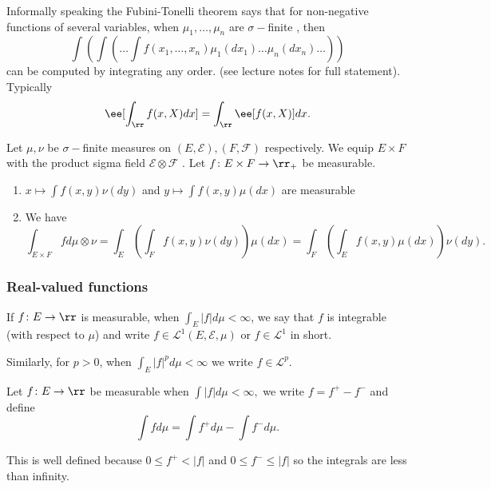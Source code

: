 \documentclass[../main.tex]{subfiles}
\begin{document}
Informally speaking the Fubini-Tonelli theorem says that for
non-negative functions of several variables, when $\mu_1, \ldots,
\mu_{n}$ are $\sigma-$finite , then
\[
  \int\left(\int \left(\ldots \int f(x_1,\ldots, x_n) \mu_1(dx_1) \ldots
  \mu_n(dx_n)\ldots\right)\right)
\]
can be computed by integrating any order. (see lecture notes for full
statement). Typically
\[
  \ee [\int_{\rr} f(x, X) dx ] = \int_{\rr} \ee[f(x, X)]dx
.\] 

\begin{theorem}
  Let $\mu, \nu$ be $\sigma-$finite measures on $(E, \mathcal{E}), (F, \mathcal{F})$ 
  respectively. We equip $E\times F$ with the product sigma field
  $\mathcal{E} \otimes \mathcal{F}$ . Let $f \colon E\times F \to \rr_+$ be measurable.
  \begin{enumerate}
    \item $x \mapsto \int f(x, y)\nu(dy)$ and $y \mapsto \int f(x,y)\mu(dx)$ are measurable
    \item We have 
      \[
        \int_{E \times F} f d\mu\otimes\nu = \int_{E} \left( \int_F f(x,y)\nu(dy) \right) \mu(dx) =
        \int_{F} \left( \int_E f(x,y)\mu(dx) \right) \nu(dy)
      .\] 
  \end{enumerate}
\end{theorem}

\subsubsection{Real-valued functions}

If $f \colon E \to \rr$ is measurable, when $\int_{E} |f| d\mu <
\infty$, we say that $f$ is integrable (with respect to $\mu$) and
write $f\in \mathcal{L}^1 (E, \mathcal{E}, \mu)$ or $f \in
\mathcal{L}^1$ in short.

\vspace{0.5em}

Similarly, for $p > 0$, when $\int_{E} |f|^p d\mu <  \infty$ we write
$f \in \mathcal{L}^p$.

\begin{definition}
    Let $f \colon E \to \rr$ be measurable when $\int |f| d\mu <
    \infty,$ we write $f = f^+ - f^-$ and define
    \[
    \int fd\mu = \int f^+ d\mu - \int f^- d\mu
    .\] 
\end{definition}

This is well defined because $0 \leq f^+ < |f|$ and $0 \leq f^- \leq
|f|$ so the integrals are less than infinity.
 
\vspace{1em}
\end{document}
